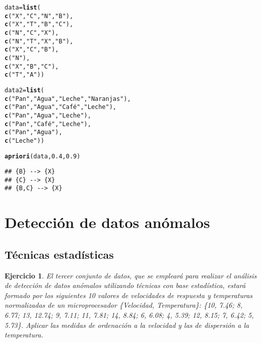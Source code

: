 \documentclass[12pt]{report}\usepackage[]{graphicx}\usepackage[dvipsnames]{xcolor}
\makeatletter
\newcommand{\hlnum}[1]{\textcolor[rgb]{0.686,0.059,0.569}{#1}}%
\newcommand{\hlstr}[1]{\textcolor[rgb]{0.192,0.494,0.8}{#1}}%
\newcommand{\hlstd}[1]{\textcolor[rgb]{0.345,0.345,0.345}{#1}}%
\newcommand{\hlkwb}[1]{\textcolor[rgb]{0.69,0.353,0.396}{#1}}%
\newcommand{\hlkwd}[1]{\textcolor[rgb]{0.737,0.353,0.396}{\textbf{#1}}}%
\newenvironment{kframe}{%
 \def\at@end@of@kframe{}%
 \ifinner\ifhmode%
  \def\at@end@of@kframe{\end{minipage}}%
  \begin{minipage}{\columnwidth}%
 \fi\fi%
 \def\FrameCommand##1{\hskip\@totalleftmargin \hskip-\fboxsep
 \colorbox{shadecolor}{##1}\hskip-\fboxsep
     \hskip-\linewidth \hskip-\@totalleftmargin \hskip\columnwidth}%
 \MakeFramed {\advance\hsize-\width
   \@totalleftmargin\z@ \linewidth\hsize
   \@setminipage}}%
 {\par\unskip\endMakeFramed%
 \at@end@of@kframe}
\newenvironment{knitrout}{}{} %
\newtheorem{exercise}{Ejercicio}[section]
\makeatother
\begin{document}
\begin{knitrout}
\color{fgcolor}\begin{kframe}
\begin{alltt}
\hlstd{data} \hlkwb{=} \hlkwd{list}\hlstd{(}
\hlkwd{c}\hlstd{(}\hlstr{"X"}\hlstd{,} \hlstr{"C"}\hlstd{,} \hlstr{"N"}\hlstd{,} \hlstr{"B"}\hlstd{),}
\hlkwd{c}\hlstd{(}\hlstr{"X"}\hlstd{,} \hlstr{"T"}\hlstd{,} \hlstr{"B"}\hlstd{,} \hlstr{"C"}\hlstd{),}
\hlkwd{c}\hlstd{(}\hlstr{"N"}\hlstd{,} \hlstr{"C"}\hlstd{,} \hlstr{"X"}\hlstd{),}
\hlkwd{c}\hlstd{(}\hlstr{"N"}\hlstd{,} \hlstr{"T"}\hlstd{,} \hlstr{"X"}\hlstd{,} \hlstr{"B"}\hlstd{),}
\hlkwd{c}\hlstd{(}\hlstr{"X"}\hlstd{,} \hlstr{"C"}\hlstd{,} \hlstr{"B"}\hlstd{),}
\hlkwd{c}\hlstd{(}\hlstr{"N"}\hlstd{),}
\hlkwd{c}\hlstd{(}\hlstr{"X"}\hlstd{,} \hlstr{"B"}\hlstd{,} \hlstr{"C"}\hlstd{),}
\hlkwd{c}\hlstd{(}\hlstr{"T"}\hlstd{,} \hlstr{"A"}\hlstd{))}

\hlstd{data2} \hlkwb{=} \hlkwd{list}\hlstd{(}
\hlkwd{c}\hlstd{(}\hlstr{"Pan"}\hlstd{,} \hlstr{"Agua"}\hlstd{,} \hlstr{"Leche"}\hlstd{,} \hlstr{"Naranjas"}\hlstd{),}
\hlkwd{c}\hlstd{(}\hlstr{"Pan"}\hlstd{,} \hlstr{"Agua"}\hlstd{,} \hlstr{"Café"}\hlstd{,} \hlstr{"Leche"}\hlstd{),}
\hlkwd{c}\hlstd{(}\hlstr{"Pan"}\hlstd{,} \hlstr{"Agua"}\hlstd{,} \hlstr{"Leche"}\hlstd{),}
\hlkwd{c}\hlstd{(}\hlstr{"Pan"}\hlstd{,} \hlstr{"Café"}\hlstd{,} \hlstr{"Leche"}\hlstd{),}
\hlkwd{c}\hlstd{(}\hlstr{"Pan"}\hlstd{,} \hlstr{"Agua"}\hlstd{),}
\hlkwd{c}\hlstd{(}\hlstr{"Leche"}\hlstd{))}

\hlkwd{apriori}\hlstd{(data,} \hlnum{0.4}\hlstd{,} \hlnum{0.9}\hlstd{)}
\end{alltt}
\begin{verbatim}
## {B} --> {X}
## {C} --> {X}
## {B,C} --> {X}
\end{verbatim}
\end{kframe}
\end{knitrout}
			
		
		\section{Detección de datos anómalos}
		
			\subsection{Técnicas estadísticas}
			
				\begin{exercise}
					El tercer conjunto de datos, que se empleará para realizar el análisis de detección de datos anómalos utilizando técnicas con base estadística, estará formado por los siguientes 10 valores de velocidades de respuesta y temperaturas normalizadas de un microprocesador \{Velocidad, Temperatura\}: \{10, 7.46; 8, 6.77; 13, 12.74; 9, 7.11; 11, 7.81; 14, 8.84; 6, 6.08; 4, 5.39; 12, 8.15; 7, 6.42; 5, 5.73\}. Aplicar las medidas de ordenación a la velocidad y las de dispersión a la temperatura.
				\end{exercise}
				
\end{document}
